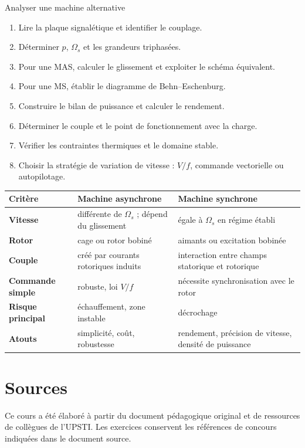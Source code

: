 \begin{TLMachineMethod}{Analyser une machine alternative}
\begin{enumerate}
  \item Lire la plaque signalétique et identifier le couplage.
  \item Déterminer $p$, $\Omega_s$ et les grandeurs triphasées.
  \item Pour une MAS, calculer le glissement et exploiter le schéma équivalent.
  \item Pour une MS, établir le diagramme de Behn--Eschenburg.
  \item Construire le bilan de puissance et calculer le rendement.
  \item Déterminer le couple et le point de fonctionnement avec la charge.
  \item Vérifier les contraintes thermiques et le domaine stable.
  \item Choisir la stratégie de variation de vitesse : $V/f$, commande vectorielle ou autopilotage.
\end{enumerate}
\end{TLMachineMethod}

\begin{center}
\small
\begin{tabularx}{\linewidth}{>{\bfseries}p{3.2cm}X X}
\toprule
Critère & Machine asynchrone & Machine synchrone \\
\midrule
Vitesse & différente de $\Omega_s$ ; dépend du glissement & égale à $\Omega_s$ en régime établi\\
Rotor & cage ou rotor bobiné & aimants ou excitation bobinée\\
Couple & créé par courants rotoriques induits & interaction entre champs statorique et rotorique\\
Commande simple & robuste, loi $V/f$ & nécessite synchronisation avec le rotor\\
Risque principal & échauffement, zone instable & décrochage\\
Atouts & simplicité, coût, robustesse & rendement, précision de vitesse, densité de puissance\\
\bottomrule
\end{tabularx}
\end{center}

\section{Sources}
\label{sec:masms-7}

Ce cours a été élaboré à partir du document pédagogique original et de ressources de collègues de l'UPSTI. Les exercices conservent les références de concours indiquées dans le document source.
